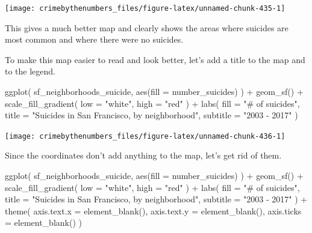 \documentclass[
  a4paper,
]{krantz}
\makeatletter
\newenvironment{Shaded}{\begin{snugshade}}{\end{snugshade}}
\newcommand{\AttributeTok}[1]{\textcolor[rgb]{0.77,0.63,0.00}{#1}}
\newcommand{\FunctionTok}[1]{\textcolor[rgb]{0.00,0.00,0.00}{#1}}
\newcommand{\NormalTok}[1]{#1}
\newcommand{\SpecialCharTok}[1]{\textcolor[rgb]{0.00,0.00,0.00}{#1}}
\newcommand{\StringTok}[1]{\textcolor[rgb]{0.31,0.60,0.02}{#1}}
\newenvironment{kframe}{%
\medskip{}
\setlength{\fboxsep}{.8em}
 \def\at@end@of@kframe{}%
 \ifinner\ifhmode%
  \def\at@end@of@kframe{\end{minipage}}%
  \begin{minipage}{\columnwidth}%
 \fi\fi%
 \def\FrameCommand##1{\hskip\@totalleftmargin \hskip-\fboxsep
 \colorbox{shadecolor}{##1}\hskip-\fboxsep
     \hskip-\linewidth \hskip-\@totalleftmargin \hskip\columnwidth}%
 \MakeFramed {\advance\hsize-\width
   \@totalleftmargin\z@ \linewidth\hsize
   \@setminipage}}%
 {\par\unskip\endMakeFramed%
 \at@end@of@kframe}
\renewenvironment{Shaded}{\begin{kframe}}{\end{kframe}}
\makeatother
\begin{document}
\begin{center}\texttt{[image: crimebythenumbers\_files/figure-latex/unnamed-chunk-435-1]} \end{center}

This gives a much better map and clearly shows the areas
where suicides are most common and where there were no
suicides.

To make this map easier to read and look better, let's add a
title to the map and to the legend.

\begin{Shaded}
\begin{Highlighting}[]
\FunctionTok{ggplot}\NormalTok{(}
\NormalTok{  sf\_neighborhoods\_suicide,}
  \FunctionTok{aes}\NormalTok{(}\AttributeTok{fill =}\NormalTok{ number\_suicides)}
\NormalTok{) }\SpecialCharTok{+}
  \FunctionTok{geom\_sf}\NormalTok{() }\SpecialCharTok{+}
  \FunctionTok{scale\_fill\_gradient}\NormalTok{(}
    \AttributeTok{low =} \StringTok{"white"}\NormalTok{,}
    \AttributeTok{high =} \StringTok{"red"}
\NormalTok{  ) }\SpecialCharTok{+}
  \FunctionTok{labs}\NormalTok{(}
    \AttributeTok{fill =} \StringTok{"\# of suicides"}\NormalTok{,}
    \AttributeTok{title =} \StringTok{"Suicides in San Francisco, by neighborhood"}\NormalTok{,}
    \AttributeTok{subtitle =} \StringTok{"2003 {-} 2017"}
\NormalTok{  )}
\end{Highlighting}
\end{Shaded}

\begin{center}\texttt{[image: crimebythenumbers\_files/figure-latex/unnamed-chunk-436-1]} \end{center}

Since the coordinates don't add anything to the map, let's
get rid of them.

\begin{Shaded}
\begin{Highlighting}[]
\FunctionTok{ggplot}\NormalTok{(}
\NormalTok{  sf\_neighborhoods\_suicide,}
  \FunctionTok{aes}\NormalTok{(}\AttributeTok{fill =}\NormalTok{ number\_suicides)}
\NormalTok{) }\SpecialCharTok{+}
  \FunctionTok{geom\_sf}\NormalTok{() }\SpecialCharTok{+}
  \FunctionTok{scale\_fill\_gradient}\NormalTok{(}
    \AttributeTok{low =} \StringTok{"white"}\NormalTok{,}
    \AttributeTok{high =} \StringTok{"red"}
\NormalTok{  ) }\SpecialCharTok{+}
  \FunctionTok{labs}\NormalTok{(}
    \AttributeTok{fill =} \StringTok{"\# of suicides"}\NormalTok{,}
    \AttributeTok{title =} \StringTok{"Suicides in San Francisco, by neighborhood"}\NormalTok{,}
    \AttributeTok{subtitle =} \StringTok{"2003 {-} 2017"}
\NormalTok{  ) }\SpecialCharTok{+}
  \FunctionTok{theme}\NormalTok{(}
    \AttributeTok{axis.text.x =} \FunctionTok{element\_blank}\NormalTok{(),}
    \AttributeTok{axis.text.y =} \FunctionTok{element\_blank}\NormalTok{(),}
    \AttributeTok{axis.ticks =} \FunctionTok{element\_blank}\NormalTok{()}
\NormalTok{  )}
\end{Highlighting}
\end{Shaded}
\end{document}
